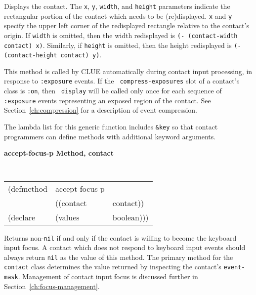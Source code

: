 \begin{flushright} \parbox[t]{6.125in}
{ Displays the contact.  The {\tt x},
{\tt y}, {\tt width}, and {\tt height} parameters indicate the rectangular
portion of the contact which needs to be (re)displayed.  {\tt x} and {\tt y}
specify the upper left corner of the redisplayed rectangle relative to the
contact's origin.  If {\tt width} is omitted, then the width redisplayed is
{\tt (- (contact-width contact) x)}.  Similarly, if {\tt height} is omitted,
then the height redisplayed is {\tt (- (contact-height contact) y)}.

This method is called by CLUE automatically during contact input
processing, in response to {\tt :exposure} events.  If the {\tt
compress-exposures} slot of a contact's class is {\tt :on}, then {\tt
display} will be called only once for each sequence of {\tt :exposure}
events representing an exposed region of the contact.   See Section~\ref{ch:compression}
for a description of event compression.

The lambda list for this generic function includes {\tt \&key} so that contact
programmers can define methods with additional keyword arguments.
}\end{flushright}


{\samepage
{\large {\bf accept-focus-p \hfill Method, contact}}
\begin{flushright}
\parbox[t]{6.125in}{
\tt
\begin{tabular}{lll}
\raggedright
(defmethod & accept-focus-p & \\
& ((contact  &contact)) \\
(declare & (values & boolean)))
\end{tabular}
\rm}
\end{flushright}
}

\begin{flushright}\parbox[t]{6.125in}{
Returns  non-{\tt nil} if and only if the contact is willing to become the
keyboard input focus. A contact which does not respond to keyboard input
events should always return {\tt nil} as the value of this method. The
primary method for the {\tt contact} class determines the value returned by
inspecting the contact's {\tt event-mask}.  Management of
contact input focus is discussed further in Section~\ref{ch:focus-management}.

}\end{flushright}

